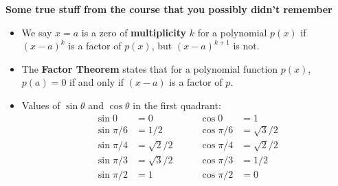 \documentclass[12pt]{article}
\begin{document}
\begin{center}
 \textbf{Some true stuff from the course that you possibly didn't remember}
\end{center}
\begin{itemize}
 \item We say $x=a$ is a zero of {\bf multiplicity} $k$ for a polynomial $p(x)$ if $(x-a)^k$ is a factor of $p(x)$, but $(x-a)^{k+1}$ is not.
 \item The {\bf Factor Theorem} states that for a polynomial function $p(x)$, $p(a)=0$ if and only if $(x-a)$ is a factor of $p$.
 \item Values of $\sin\theta$ and $\cos\theta$ in the first quadrant:
\begin{align*}
 \sin 0 &= 0  \quad& \quad \cos 0 &= 1\\
 \sin \pi/6 &= 1/2   \quad& \quad\cos \pi/6 &= \sqrt{3}/2\\
 \sin \pi/4 &= \sqrt{2}/2  \quad &\quad \cos \pi/4& = \sqrt{2}/2\\
 \sin \pi/3 &= \sqrt{3}/2   \quad &\quad\cos \pi/3& = 1/2\\
 \sin \pi/2 &= 1  \quad &\quad \cos \pi/2 &= 0
\end{align*}


\end{itemize}
\end{document}
